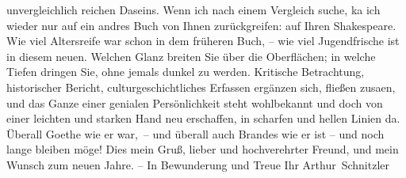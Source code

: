 \begin{ledgroupsized}[t]{13cm}
               unvergleichlich reichen Daseins. Wenn ich nach einem Vergleich suche, ka{\geminationn} ich wieder nur auf ein andres Buch von Ihnen
               zurückgreifen: auf Ihren Shakespeare. Wie viel Altersreife war schon in dem früheren Buch, – wie viel Jugendfrische
                  \introOben{}ist\introOben{} in diesem neuen. Welchen Glanz breiten Sie über die
               Oberflächen; in welche Tiefen dringen Sie, ohne jemals dunkel zu werden. {\pb}Kritische Betrachtung, historischer Bericht,
               culturgeschichtliches Erfassen ergänzen sich, fließen zusa{\geminationm}en, und das Ganze einer genialen Persönlichkeit steht
               wohlbekannt und doch von einer leichten und starken Hand neu erschaffen, in scharfen
               und hellen Linien da. Überall Goethe wie er
               war, – und überall auch Brandes wie er ist – und noch lange bleiben möge! Dies mein
               Gruß, lieber und hochverehrter Freund, und mein Wunsch zum neuen Jahre. – In
               Bewunderung und Treue\pend
           \pstart Ihr \spacefill\mbox{Arthur Schnitzler}\pend{}
         
         \endnumbering{}\end{ledgroupsized}  \newcommand{\dateiname}{L02372}\newcommand{\titel}{Arthur Schnitzler an Georg Brandes, 28. 12. 1921}\newcommand{\editorInnen}{Martin Anton Müller und Gerd-Hermann Susen}
      